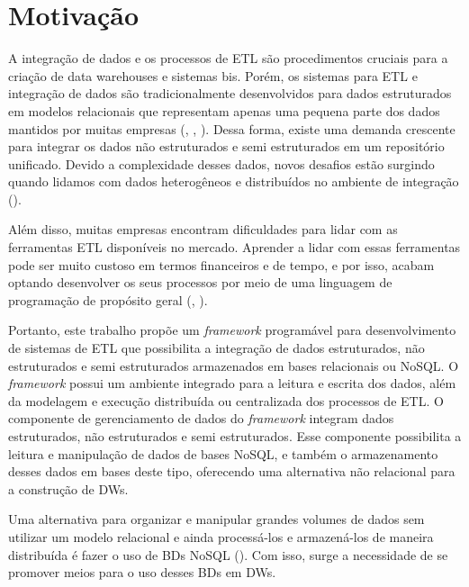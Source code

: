 %

\section{Motivação}

A integração de dados e os processos de ETL são procedimentos cruciais para a criação de data warehouses e sistemas \acp{bi}. Porém, os sistemas para ETL e integração de dados são tradicionalmente desenvolvidos para dados estruturados em modelos relacionais que representam apenas uma pequena parte dos dados mantidos por muitas empresas (\cite{darmont:2005}, \cite{russom:2007}, \cite{thomsen:2009}). Dessa forma, existe uma demanda crescente para integrar os dados não estruturados e semi estruturados em um repositório unificado. Devido a complexidade desses dados, novos desafios estão surgindo quando lidamos com dados heterogêneos e distribuídos no ambiente de integração (\cite{salem:2012}).

Além disso, muitas empresas encontram dificuldades para lidar com as ferramentas ETL disponíveis no mercado. Aprender a lidar com essas ferramentas pode ser muito custoso em termos financeiros e de tempo, e por isso, acabam optando desenvolver os seus processos por meio de uma linguagem de programação de propósito geral (\cite{awad:2011}, \cite{munoz:2009}).

Portanto, este trabalho propõe um \textit{framework} programável para desenvolvimento de sistemas de ETL que possibilita a integração de dados estruturados, não estruturados e semi estruturados armazenados em bases relacionais ou NoSQL. O \textit{framework} possui um ambiente integrado para a leitura e escrita dos dados, além da modelagem e execução distribuída ou centralizada dos processos de ETL. O componente de gerenciamento de dados do \textit{framework} integram dados estruturados, não estruturados e semi estruturados. Esse componente possibilita a leitura e manipulação de dados de bases NoSQL, e também o armazenamento desses dados em bases deste tipo, oferecendo uma alternativa não relacional para a construção de DWs.

Uma alternativa para organizar e manipular grandes volumes de dados sem utilizar um modelo relacional e ainda processá-los e armazená-los de maneira distribuída é fazer o uso de BDs NoSQL (\cite{scabora:2016}). Com isso, surge a necessidade de se promover meios para o uso desses BDs em DWs. 

